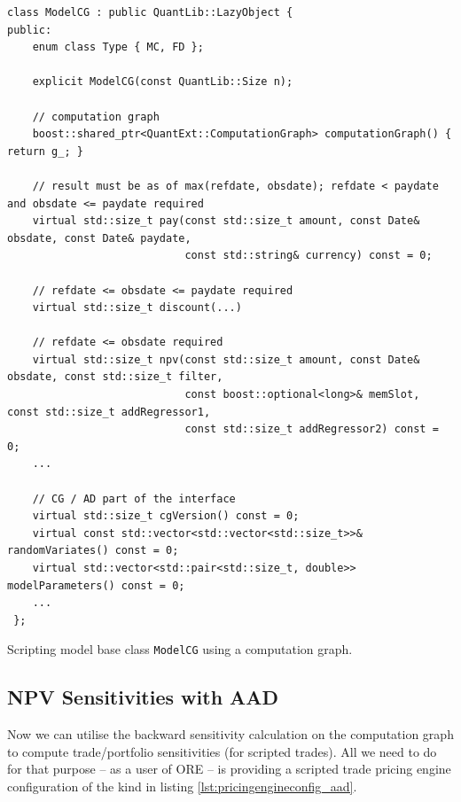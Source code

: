 \documentclass[12pt, a4paper]{report}
\begin{document}
\begin{listing}
\begin{verbatim}
class ModelCG : public QuantLib::LazyObject {
public:
    enum class Type { MC, FD };

    explicit ModelCG(const QuantLib::Size n);

    // computation graph
    boost::shared_ptr<QuantExt::ComputationGraph> computationGraph() { return g_; }

    // result must be as of max(refdate, obsdate); refdate < paydate and obsdate <= paydate required
    virtual std::size_t pay(const std::size_t amount, const Date& obsdate, const Date& paydate,
                            const std::string& currency) const = 0;

    // refdate <= obsdate <= paydate required
    virtual std::size_t discount(...)

    // refdate <= obsdate required
    virtual std::size_t npv(const std::size_t amount, const Date& obsdate, const std::size_t filter,
                            const boost::optional<long>& memSlot, const std::size_t addRegressor1,
                            const std::size_t addRegressor2) const = 0;
    ...

    // CG / AD part of the interface
    virtual std::size_t cgVersion() const = 0;
    virtual const std::vector<std::vector<std::size_t>>& randomVariates() const = 0; 
    virtual std::vector<std::pair<std::size_t, double>> modelParameters() const = 0;
    ...
 };
\end{verbatim}
\caption{Scripting model base class {\tt ModelCG} using a computation graph.}
\label{lst:modelcg}
\end{listing}

\subsection{NPV Sensitivities with AAD}

Now we can utilise the backward sensitivity calculation on the computation graph to compute
trade/portfolio sensitivities (for scripted trades). All we need to do for that purpose -- as a user
of ORE -- is providing a scripted trade pricing engine configuration of the kind in listing
\ref{lst:pricingengineconfig_aad}.
\end{document}
